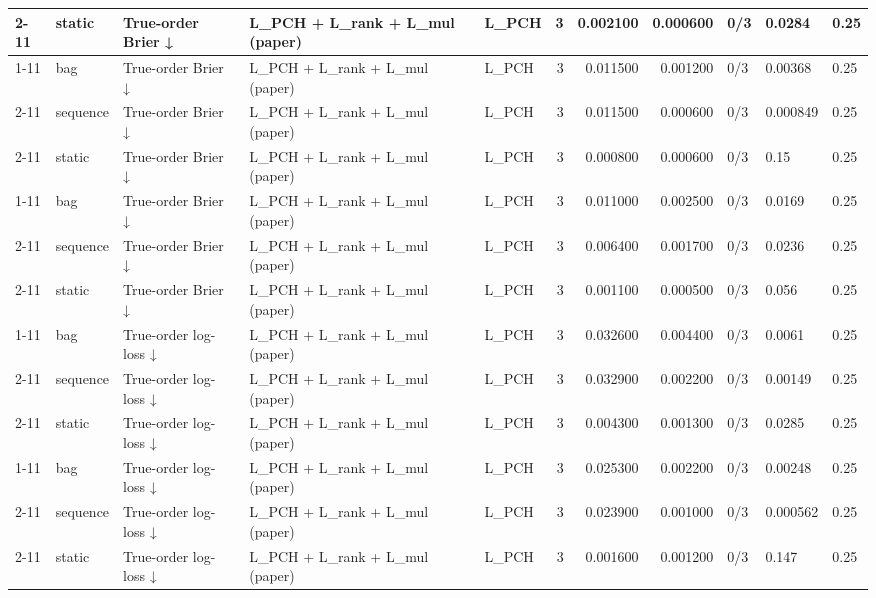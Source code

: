 \begin{tabular}{lllllrrrlll}
\cline{2-11} \cline{3-11}
 & static & True-order Brier ↓ & L\_PCH + L\_rank + L\_mul (paper) & L\_PCH & 3 & 0.002100 & 0.000600 & 0/3 & 0.0284 & 0.25 \\
\cline{1-11} \cline{2-11} \cline{3-11}
\multirow[t]{3}{*}{ehrsim2\_mixed} & bag & True-order Brier ↓ & L\_PCH + L\_rank + L\_mul (paper) & L\_PCH & 3 & 0.011500 & 0.001200 & 0/3 & 0.00368 & 0.25 \\
\cline{2-11} \cline{3-11}
 & sequence & True-order Brier ↓ & L\_PCH + L\_rank + L\_mul (paper) & L\_PCH & 3 & 0.011500 & 0.000600 & 0/3 & 0.000849 & 0.25 \\
\cline{2-11} \cline{3-11}
 & static & True-order Brier ↓ & L\_PCH + L\_rank + L\_mul (paper) & L\_PCH & 3 & 0.000800 & 0.000600 & 0/3 & 0.15 & 0.25 \\
\cline{1-11} \cline{2-11} \cline{3-11}
\multirow[t]{3}{*}{ehrsim2\_order} & bag & True-order Brier ↓ & L\_PCH + L\_rank + L\_mul (paper) & L\_PCH & 3 & 0.011000 & 0.002500 & 0/3 & 0.0169 & 0.25 \\
\cline{2-11} \cline{3-11}
 & sequence & True-order Brier ↓ & L\_PCH + L\_rank + L\_mul (paper) & L\_PCH & 3 & 0.006400 & 0.001700 & 0/3 & 0.0236 & 0.25 \\
\cline{2-11} \cline{3-11}
 & static & True-order Brier ↓ & L\_PCH + L\_rank + L\_mul (paper) & L\_PCH & 3 & 0.001100 & 0.000500 & 0/3 & 0.056 & 0.25 \\
\cline{1-11} \cline{2-11} \cline{3-11}
\multirow[t]{3}{*}{ehrsim2\_level} & bag & True-order log-loss ↓ & L\_PCH + L\_rank + L\_mul (paper) & L\_PCH & 3 & 0.032600 & 0.004400 & 0/3 & 0.0061 & 0.25 \\
\cline{2-11} \cline{3-11}
 & sequence & True-order log-loss ↓ & L\_PCH + L\_rank + L\_mul (paper) & L\_PCH & 3 & 0.032900 & 0.002200 & 0/3 & 0.00149 & 0.25 \\
\cline{2-11} \cline{3-11}
 & static & True-order log-loss ↓ & L\_PCH + L\_rank + L\_mul (paper) & L\_PCH & 3 & 0.004300 & 0.001300 & 0/3 & 0.0285 & 0.25 \\
\cline{1-11} \cline{2-11} \cline{3-11}
\multirow[t]{3}{*}{ehrsim2\_mixed} & bag & True-order log-loss ↓ & L\_PCH + L\_rank + L\_mul (paper) & L\_PCH & 3 & 0.025300 & 0.002200 & 0/3 & 0.00248 & 0.25 \\
\cline{2-11} \cline{3-11}
 & sequence & True-order log-loss ↓ & L\_PCH + L\_rank + L\_mul (paper) & L\_PCH & 3 & 0.023900 & 0.001000 & 0/3 & 0.000562 & 0.25 \\
\cline{2-11} \cline{3-11}
 & static & True-order log-loss ↓ & L\_PCH + L\_rank + L\_mul (paper) & L\_PCH & 3 & 0.001600 & 0.001200 & 0/3 & 0.147 & 0.25 \\

\end{tabular}

